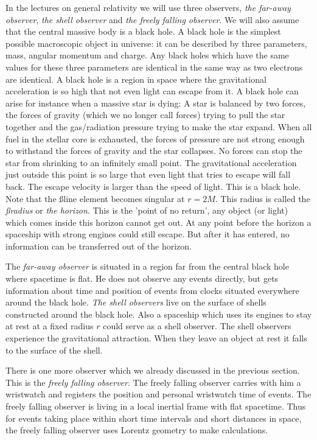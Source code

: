 {\begin{multicols}{2}
In the lectures on general relativity we will use three observers, {\it the far-away observer}, {\it the shell observer} and {\it the freely falling observer}. We will also assume that the central massive body is a black hole. A black hole is the simplest possible macroscopic object in universe: it can be described by three parameters, mass, angular momentum and charge. Any black holes which have the same values for these three parameters are identical in the same way as two electrons are identical. A black hole is a region in space where the gravitational acceleration is so high that not even light can escape from it. A black hole can arise for instance when a massive star is dying: A star is balanced by two forces, the forces of gravity (which we no longer call forces) trying to pull the star together and the gas/radiation pressure trying to make the star expand. When all fuel in the stellar core is exhausted, the forces of pressure are not strong enough to withstand the forces of gravity and the star collapses. No forces can stop the star from shrinking to an infinitely small point. The gravitational acceleration just outside this point is so large that even light that tries to escape will fall back. The escape velocity is larger than the speed of light. This is a black hole. Note that the \ss line element becomes singular at $r=2M$. This radius is called the {\it \ss radius} or {\it the horizon}. This is the 'point of no return', any object (or light) which comes inside this horizon cannot get out. At any point before the horizon a spaceship with strong engines could still escape. But after it has entered, no information can be transferred out of the horizon.

The {\it far-away observer} is situated in a region far from the central black hole where spacetime is flat. He does not observe any events directly, but gets information about time and position of events from clocks situated everywhere around the black hole. {\it The shell observers} live on the surface of shells constructed around the black hole. Also a spaceship which uses its engines to stay at rest at a fixed radius $r$ could serve as a shell observer. The shell observers experience the gravitational attraction. When they leave an object at rest it falls to the surface of the shell. 

There is one more observer which we already discussed in the previous section. This is the {\it freely falling observer}. The freely falling observer carries with him a wristwatch and registers the position and personal wristwatch time of events. The freely falling observer is living in a local inertial frame with flat spacetime. Thus for events taking place within short time intervals and short distances in space, the freely falling observer uses Lorentz geometry to make calculations.


\end{multicols}}

